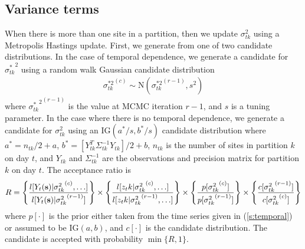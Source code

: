 \documentclass[11pt]{article}
\begin{document}
\subsection*{Variance terms}
When there is more than one site in a partition, then we update $\sigma^2_{tk}$ using a Metropolis Hastings update.
First, we generate from one of two candidate distributions.
In the case of temporal dependence, we generate a candidate for ${\sigma^*_{tk}}^2$ using a random walk Gaussian candidate distribution
\begin{align*}
  {\sigma^{*2}_{tk}}^{(c)} \sim \text{N}({\sigma^{*2}_{tk}}^{(r - 1)}, s^2)
\end{align*}
where ${{\sigma^*_{tk}}^2}^{(r - 1)}$ is the value at MCMC iteration $r - 1$, and $s$ is a tuning parameter.
In the case where there is no temporal dependence, we generate a candidate for $\sigma^2_{tk}$ using an IG$(a^*/s, b^*/s)$ candidate distribution where $a^* = n_{tk} / 2 + a$, $b^* = [Y_{tk}^T \Sigma^{-1}_{tk} Y_{tk}] / 2 + b$, $n_{tk}$ is the number of sites in partition $k$ on day $t$, and $Y_{tk}$ and $\Sigma^{-1}_{tk}$ are the observations and precision matrix for partition $k$ on day $t$.
The acceptance ratio is
\begin{align*}
  R = \left\{
    \frac{ l[Y_t(\mbox{\bf s}) | {\sigma^2_{tk}}^{(c)}, \ldots] }
         { l[Y_t(\mbox{\bf s}) | {\sigma^2_{tk}}^{(r - 1)}]}
    \right\} \times \left\{
    \frac{ l[z_tk | {\sigma^2_{tk}}^{(c)}, \ldots] }
         { l[z_tk | {\sigma^2_{tk}}^{(r - 1)}, \ldots] }
    \right\} \times \left\{
    \frac{ p[ {\sigma^2_{tk}}^{(c)} ] }
         { p[ {\sigma^2_{tk}}^{(r - 1)}] }
    \right\} \times \left\{
    \frac{ c[ {\sigma^2_{tk}}^{(r - 1)}] }
         { c[ {\sigma^2_{tk}}^{(c)}]}
    \right\}
\end{align*}
where $p[\cdot]$ is the prior either taken from the time series given in (\ref{s:temporal}) or assumed to be IG$(a, b)$, and $c[\cdot]$ is the candidate distribution.
The candidate is accepted with probability $\min\{R, 1\}$.
\end{document}

